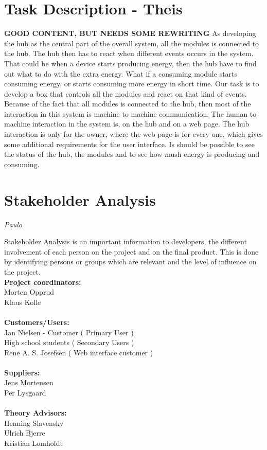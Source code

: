 \section{Task Description - Theis}
\textbf{GOOD CONTENT, BUT NEEDS SOME REWRITING}
As developing the hub as the central part of the overall system, all the modules is connected to the hub. The hub then has to react when different events occurs in the system. That could be when a device starts producing energy, then the hub have to find out what to do with the extra energy. What if a consuming module starts consuming energy, or starts consuming more energy in short time. Our task is to develop a box that controls all the modules and react on that kind of events. Because of the fact that all modules is connected to the hub, then most of the interaction in this system is machine to machine communication. The human to machine interaction in the system is, on the hub and on a web page. The hub interaction is only for the owner, where the web page is for every one, which gives some additional requirements for the user interface. Is should be possible to see the status of the hub, the modules and to see how mush energy is producing and consuming.

\section{Stakeholder Analysis}
\textit{Paulo}

Stakeholder Analysis is an important information to developers, the different involvement of each person on the project and on the final product. This is done by identifying persons or groups which are relevant and the level of influence on the project.
\\[0.2cm]
\textbf{Project coordinators:}\\ Morten Opprud\\ Klaus Kolle\\
\\
\textbf{Customers/Users:}\\
Jan Nielsen - Customer ( Primary User )\\
High school students ( Secondary Users )\\
Rene A. S. Josefsen ( Web interface customer )\\
\\
\textbf{Suppliers:}\\
Jens Mortensen\\
Per Lysgaard\\
\\
\textbf{Theory Advisors:}\\
Henning Slavensky\\
Ulrich Bjerre\\
Kristian Lomholdt\\

